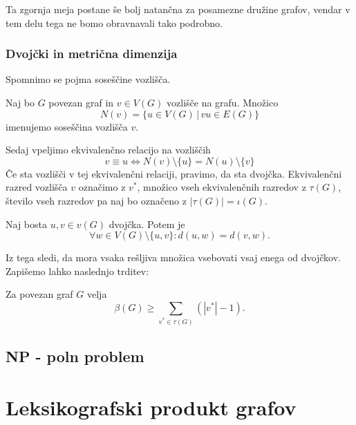 \documentclass[mat1, tisk]{fmfdelo}
\begin{document}
Ta zgornja meja postane še bolj natančna za posamezne družine grafov, vendar v tem delu
tega ne bomo obravnavali tako podrobno.

\subsubsection{Dvojčki in metrična dimenzija}
Spomnimo se pojma soseščine vozlišča.

\begin{definicija}
    Naj bo $G$ povezan graf in $v \in V(G)$ vozlišče na grafu. Množico 
    $$N(v) = \{u \in V(G) \, | \,vu \in E(G) \}$$ imenujemo soseščina vozlišča $v$.
\end{definicija}

Sedaj vpeljimo ekvivalenčno relacijo na vozliščih
$$v \equiv u \Leftrightarrow N(v)\setminus \{u\} = N(u) \setminus \{v\}$$
Če sta vozlišči v tej ekvivalenčni relaciji, pravimo, da sta dvojčka. 
Ekvivalenčni razred vozlišča $v$ označimo z $v^{*}$, 
množico vseh ekvivalenčnih razredov z $\tau (G)$, število vseh razredov pa naj bo označeno 
z $|\tau(G)| = \iota(G).$

\begin{lema}
    Naj bosta $u, v \in v(G)$ dvojčka. Potem je 
    $$\forall w \in V(G) \setminus \{u, v\} : d(u, w) = d(v, w).$$
\end{lema}

\begin{dokaz}
\end{dokaz}

Iz tega sledi, da mora vsaka rešljiva množica vsebovati vsaj enega od dvojčkov.
Zapišemo lahko naslednjo trditev:

\begin{trditev}
    Za povezan graf $G$ velja
    $$\beta(G) \geq \sum_{v^{*} \in \tau(G)} (|v^{*}| - 1).$$
\end{trditev}

\begin{dokaz}
\end{dokaz}

\subsection{NP - poln problem}

\section{Leksikografski produkt grafov}
\end{document}
